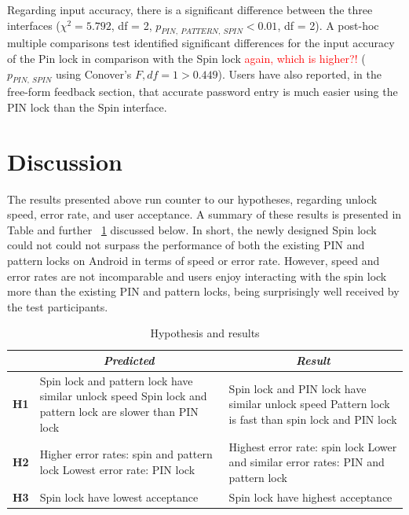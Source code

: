 \documentclass{sigchi}
\newcommand{\comment}[1]{\textcolor{red}{#1}}
\begin{document}
Regarding input accuracy, there is a significant difference between the three interfaces ($\chi^{2} = 5.792$, df = 2, $p_{PIN,\:PATTERN, \:SPIN} < 0.01$, df = 2). A post-hoc multiple comparisons test identified significant differences for the input accuracy of the Pin lock in comparison with the Spin lock \comment{again, which is higher?!} ($p_{PIN,\:SPIN}$ using Conover's $F, df = 1 >  0.449$).  Users have also reported, in the free-form feedback section, that accurate password entry is much easier using the PIN lock than the Spin interface.

\section{Discussion}
The results presented above run counter to our hypotheses, regarding unlock speed, error rate, and user acceptance. A summary of these results is presented in Table  and further ~\ref{tab:hypothesis_result} discussed below. In short, the newly designed Spin lock could not could not surpass the performance of both the existing PIN and pattern locks on Android in terms of speed or error rate. However, speed and error rates are not incomparable and users enjoy interacting with the spin lock more than the existing PIN and pattern locks, being surprisingly well received by the test participants.

\begin{table}[h]
\centering
\small
  \begin{tabularx}{\columnwidth}{c  X  X}
    \toprule
     & \multicolumn{1}{c}{\small\textit{ Predicted}}  & \multicolumn{1}{c}{\small\textit{ Result}}\\
    \midrule
    \small\textbf{H1} & Spin lock and pattern lock have similar unlock speed  \newline
    								      Spin lock and pattern lock are slower than PIN lock  & 				  
    								      Spin lock and PIN lock have similar unlock speed \newline
    								      Pattern lock is fast than spin lock and PIN lock \\
    \midrule
    \small\textbf{H2} & Higher error rates: spin and pattern lock  \newline
    								      Lowest error rate: PIN lock & 
				 						Highest error rate: spin lock\newline
    								      Lower and similar error rates: PIN and pattern lock\\    \midrule
    \small\textbf{H3} &Spin lock have lowest acceptance  
    			       & Spin lock have highest acceptance\\ 
    \bottomrule
  \end{tabularx}
  \caption{Hypothesis and results}~\label{tab:hypothesis_result}
\end{table}
\end{document}
